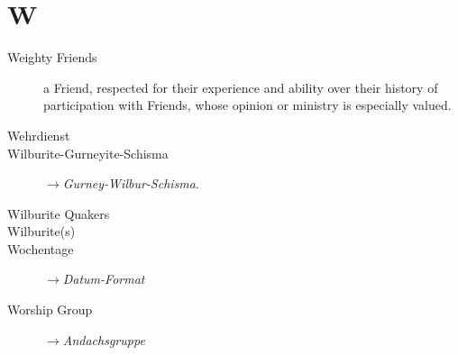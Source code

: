 \section*{W}

\articlesize

\begin{description}

 \item[Weighty Friends]
    a Friend, respected for their experience and ability over their history of participation with Friends, whose opinion or ministry is especially valued.

 
 \item[Wehrdienst]

 \item[Wilburite-Gurneyite-Schisma] $\to$\textit{Gurney-Wilbur-Schisma}.

 \item[Wilburite Quakers]

 \item[Wilburite(s)]

\item[Wochentage] $\to$\textit{Datum-Format}

\item[Worship Group] $\to$\textit{Andachsgruppe}

 \end{description}


\normalsize